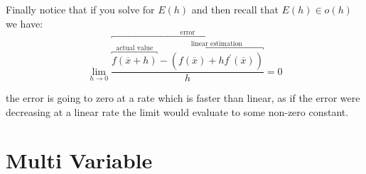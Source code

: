 Finally notice that if you solve for $ E\left( h \right) $ and then recall that $ E\left( h \right) \in o\left( h \right)  $ we have:
\[
\lim_{ h \to 0 } \frac{ \overbracket{\overbracket{f\left( \overline{x} +  h \right)}^{~\text{actual value}~ } -  \overbracket{\left( f\left( \overline{x}  \right)  +  h f ^{ \prime  } \left( \overline{x}  \right) \right)}^{~\text{linear estimation}~  }}^{~\text{error}~  } }{h}= 0
\]

the error is going to zero at a rate which is faster than linear, as if the error were decreasing at a linear rate the limit would evaluate to some non-zero constant.


\section{Multi Variable}


